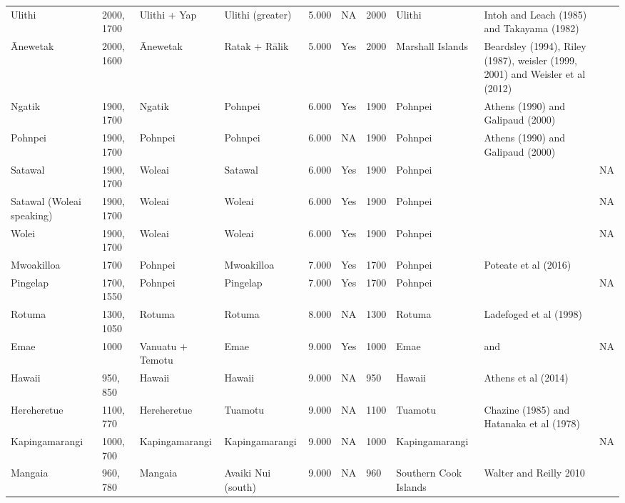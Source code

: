 \begin{longtable}{p{4.5cm}p{2cm}p{2cm}p{2cm}p{4cm}p{4cm}p{4cm}p{4cm}p{4cm}p{4cm}}
  Ulithi & 2000, 1700 & Ulithi + Yap & Ulithi (greater) & 5.000 & NA & 2000 & Ulithi & Intoh and Leach (1985) and Takayama (1982) & \citet{rieth_cochrane_2018} \\ 
  Ānewetak & 2000, 1600 & Ānewetak & Ratak + Rālik & 5.000 & Yes & 2000 & Marshall Islands & Beardsley (1994), Riley (1987), weisler (1999, 2001) and Weisler et al (2012) & \citet{rieth_cochrane_2018} \\ 
  Ngatik & 1900, 1700 & Ngatik & Pohnpei & 6.000 & Yes & 1900 & Pohnpei & Athens (1990) and Galipaud (2000) & \citet{rieth_cochrane_2018} \\ 
  Pohnpei & 1900, 1700 & Pohnpei & Pohnpei & 6.000 & NA & 1900 & Pohnpei & Athens (1990) and Galipaud (2000) & \citet{rieth_cochrane_2018} \\ 
  Satawal & 1900, 1700 & Woleai & Satawal & 6.000 & Yes & 1900 & Pohnpei & \citet{Napolitano_et_al_yap} & NA \\ 
  Satawal (Woleai speaking) & 1900, 1700 & Woleai & Woleai & 6.000 & Yes & 1900 & Pohnpei & \citet{Napolitano_et_al_yap} & NA \\ 
  Wolei & 1900, 1700 & Woleai & Woleai & 6.000 & Yes & 1900 & Pohnpei & \citet{Napolitano_et_al_yap} & NA \\ 
  Mwoakilloa & 1700 & Pohnpei & Mwoakilloa & 7.000 & Yes & 1700 & Pohnpei & Poteate et al (2016) & \citet{levin_seikel_miles_2019} \\ 
  Pingelap & 1700, 1550 & Pohnpei & Pingelap & 7.000 & Yes & 1700 & Pohnpei & \citet{levin_seikel_miles_2019} & NA \\ 
  Rotuma & 1300, 1050 & Rotuma & Rotuma & 8.000 & NA & 1300 & Rotuma & Ladefoged et al (1998) & \citet{rieth_cochrane_2018} \\ 
  Emae & 1000 & Vanuatu + Temotu & Emae & 9.000 & Yes & 1000 & Emae & \citet{kirch2012basline} and \citet{carson2012recent} & NA \\ 
  Hawaii & 950, 850 & Hawaii & Hawaii & 9.000 & NA & 950 & Hawaii & Athens et al (2014) & \citet{rieth_cochrane_2018} \\ 
  Hereheretue & 1100, 770 & Hereheretue & Tuamotu & 9.000 & NA & 1100 & Tuamotu & Chazine (1985) and Hatanaka et al (1978) & \citet{rieth_cochrane_2018} \\ 
  Kapingamarangi & 1000, 700 & Kapingamarangi & Kapingamarangi & 9.000 & NA & 1000 & Kapingamarangi & \citet{carson2012recent} & NA \\ 
  Mangaia & 960, 780 & Mangaia & Avaiki Nui (south) & 9.000 & NA & 960 & Southern Cook Islands & Walter and Reilly 2010 & \citet{walworth2015} \\ 

\end{longtable}
